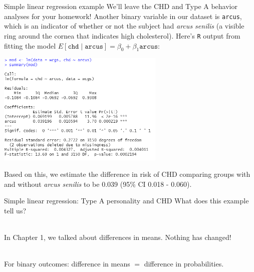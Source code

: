 \documentclass[10pt,t]{beamer}
\begin{document}
\begin{frame}{Simple linear regression example}
	\vspace{-0.8cm}
	We'll leave the CHD and Type A behavior analyses for your homework! Another binary variable in our dataset is \texttt{arcus}, which is an indicator of whether or not the subject had \textit{arcus senilis} (a visible ring around the cornea that indicates high cholesterol). Here's \texttt{R} output from fitting the model $E[\texttt{chd} \mid \texttt{arcus}] = \beta_0 + \beta_1 \texttt{arcus}$:
	
	\begin{center}
		\includegraphics[width=0.6\textwidth]{./figs/simple_linear_regression_arcus}
	\end{center}
	\vspace{-0.2cm}
	Based on this, we estimate the difference in risk of CHD comparing groups with and without \textit{arcus senilis} to be 0.039 (95\% CI 0.018 - 0.060). 
	
\end{frame}

\begin{frame}{Simple linear regression: Type A personality and CHD}
	What does this example tell us? 
	\\ ~\
	
	In Chapter 1, we talked about differences in means. Nothing has changed!
	\\ ~\

	For binary outcomes: difference in means $=$ difference in probabilities.
\end{frame}

%	
%	
\end{document}
